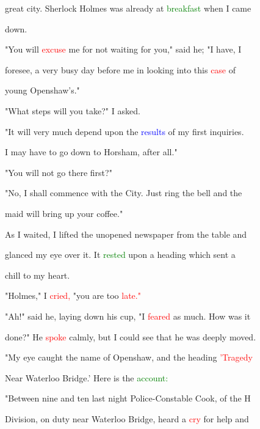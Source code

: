  great city. Sherlock Holmes was already at \textcolor{green}{breakfast} when I came

 down.



 "You will \textcolor{red}{excuse} me for not \textcolor{BurntOrange}{waiting} for you," said he; "I have, I

 \textcolor{BurntOrange}{foresee,} a very busy day before me in looking into this \textcolor{red}{case} of

 \textcolor{BurntOrange}{young} Openshaw's."



 "What steps will you take?" I asked.



 "It will very much \textcolor{BurntOrange}{depend} upon the \textcolor{blue}{results} of my first \textcolor{BurntOrange}{inquiries.}

 I may have to go down to Horsham, after all."



 "You will not go there first?"



 "No, I shall commence with the City. Just ring the bell and the

 maid will bring up your coffee."



 As I \textcolor{BurntOrange}{waited,} I lifted the unopened newspaper from the table and

 glanced my eye over it. It \textcolor{green}{rested} upon a heading which sent a

 chill to my heart.



 "Holmes," I \textcolor{red}{cried,} "you are too \textcolor{red}{late."}



 "Ah!" said he, laying down his cup, "I \textcolor{red}{feared} as much. How was it

 done?" He \textcolor{red}{spoke} calmly, but I could see that he was deeply moved.



 "My eye caught the name of Openshaw, and the heading \textcolor{red}{'Tragedy}

 Near Waterloo Bridge.' Here is the \textcolor{green}{account:}



 "Between nine and ten last night Police-Constable Cook, of the H

 Division, on duty near Waterloo Bridge, heard a \textcolor{red}{cry} for help and

